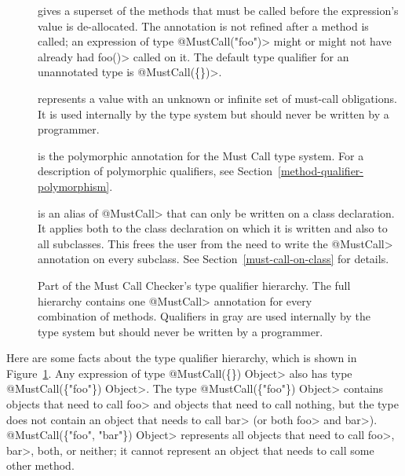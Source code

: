 \begin{description}

\item[]
  gives a superset of the methods that
  must be called before the expression's value is de-allocated.
  The annotation is not refined after a method is called; an expression of
  type \<@MustCall("foo")> might or might not have already had \<foo()>
  called on it.
  The default type qualifier for an unannotated type is \<@MustCall(\{\})>.

\item[]
  represents a value with an unknown or infinite set of must-call obligations.
  It is used internally by the type system but should never be written by a
  programmer.

\item[]
  is the polymorphic annotation for the Must Call type system.
  For a description of polymorphic qualifiers, see
  Section~\ref{method-qualifier-polymorphism}.

\item[]
  is an alias of \<@MustCall> that can only be written on a class declaration.
  It applies both to the class declaration on which it is written and also to all subclasses.
  This frees the user from the need to write the \<@MustCall> annotation on every subclass.
  See Section~\ref{must-call-on-class} for details.

\end{description}

\begin{figure}
\caption{Part of the Must Call Checker's type
qualifier hierarchy.  The full hierarchy contains one \<@MustCall> annotation
for every combination of methods.
Qualifiers in gray are used internally by the type system but should
never be written by a programmer.}
\label{fig-must-call-hierarchy}
\end{figure}

Here are some facts about the type qualifier hierarchy, which is shown in
Figure~\ref{fig-must-call-hierarchy}.
Any expression of type \<@MustCall(\{\}) Object> also has type
\<@MustCall(\{"foo"\}) Object>.
The type \<@MustCall(\{"foo"\}) Object>
contains objects that need to call \<foo> and objects that need to call
nothing, but the type does not contain an
object that needs to call \<bar> (or both \<foo> and \<bar>).
\<@MustCall(\{"foo", "bar"\}) Object> represents all objects that need to
call \<foo>, \<bar>, both, or neither; it cannot represent an object that needs
to call some other method.


